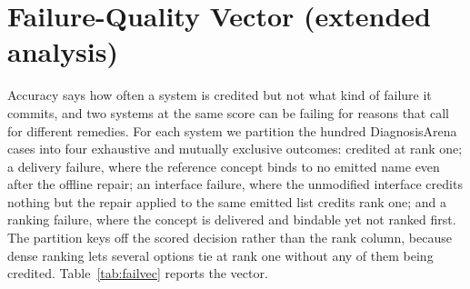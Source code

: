 \documentclass[letterpaper]{article}
\begin{document}
\section{Failure-Quality Vector (extended analysis)}
\label{sec:failvec}

Accuracy says how often a system is credited but not what kind of failure it commits, and two systems at the same score can be failing for reasons that call for different remedies.
For each system we partition the hundred DiagnosisArena cases into four exhaustive and mutually exclusive outcomes: credited at rank one; a delivery failure, where the reference concept binds to no emitted name even after the offline repair; an interface failure, where the unmodified interface credits nothing but the repair applied to the same emitted list credits rank one; and a ranking failure, where the concept is delivered and bindable yet not ranked first.
The partition keys off the scored decision rather than the rank column, because dense ranking lets several options tie at rank one without any of them being credited.
Table~\ref{tab:failvec} reports the vector.
\end{document}
